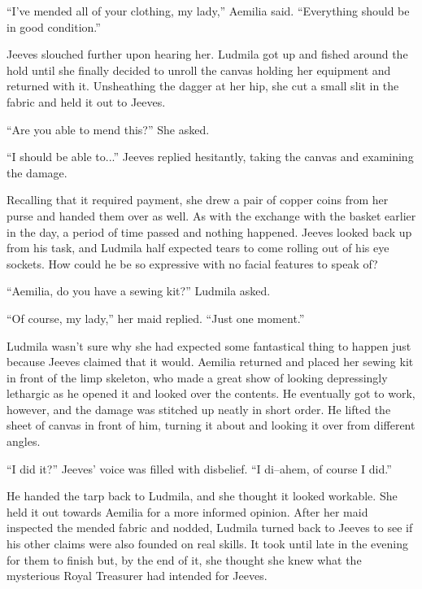  

“I’ve mended all of your clothing, my lady,” Aemilia said. “Everything should be in good condition.”

 

Jeeves slouched further upon hearing her. Ludmila got up and fished around the hold until she finally decided to unroll the canvas holding her equipment and returned with it. Unsheathing the dagger at her hip, she cut a small slit in the fabric and held it out to Jeeves.

 

“Are you able to mend this?” She asked.

 

“I should be able to...” Jeeves replied hesitantly, taking the canvas and examining the damage.

 

Recalling that it required payment, she drew a pair of copper coins from her purse and handed them over as well. As with the exchange with the basket earlier in the day, a period of time passed and nothing happened. Jeeves looked back up from his task, and Ludmila half expected tears to come rolling out of his eye sockets. How could he be so expressive with no facial features to speak of?

 

“Aemilia, do you have a sewing kit?” Ludmila asked.

 

“Of course, my lady,” her maid replied. “Just one moment.”

 

Ludmila wasn’t sure why she had expected some fantastical thing to happen just because Jeeves claimed that it would. Aemilia returned and placed her sewing kit in front of the limp skeleton, who made a great show of looking depressingly lethargic as he opened it and looked over the contents. He eventually got to work, however, and the damage was stitched up neatly in short order. He lifted the sheet of canvas in front of him, turning it about and looking it over from different angles.

 

“I did it?” Jeeves’ voice was filled with disbelief. “I di–ahem, of course I did.”

 

He handed the tarp back to Ludmila, and she thought it looked workable. She held it out towards Aemilia for a more informed opinion. After her maid inspected the mended fabric and nodded, Ludmila turned back to Jeeves to see if his other claims were also founded on real skills. It took until late in the evening for them to finish but, by the end of it, she thought she knew what the mysterious Royal Treasurer had intended for Jeeves.

